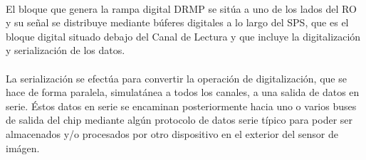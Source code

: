 \paragraph{}
El bloque que genera la rampa digital DRMP se sitúa a uno de los lados del RO y
su señal se distribuye mediante búferes digitales a lo largo del SPS, que es
el bloque digital situado debajo del Canal de Lectura y que incluye la digitalización
y serialización de los datos.

\paragraph{}
La serialización se efectúa para convertir la operación de digitalización, que se
hace de forma paralela, simulatánea a todos los canales, a una salida de datos en serie.
Éstos datos en serie se encaminan posteriormente hacia uno o varios buses de salida
del chip mediante algún protocolo de datos serie típico para poder ser almacenados
y/o procesados por otro dispositivo en el exterior del sensor de imágen.
